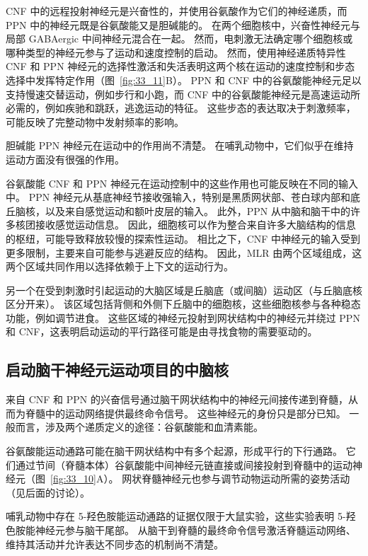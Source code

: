 CNF 中的远程投射神经元是兴奋性的，并使用谷氨酸作为它们的神经递质，而 PPN 中的神经元既是谷氨酸能又是胆碱能的。
在两个细胞核中，兴奋性神经元与局部 GABAergic 中间神经元混合在一起。
然而，电刺激无法确定哪个细胞核或哪种类型的神经元参与了运动和速度控制的启动。
然而，使用神经递质特异性 CNF 和 PPN 神经元的选择性激活和失活表明这两个核在运动的速度控制和步态选择中发挥特定作用（图~\ref{fig:33_11}B）。
PPN 和 CNF 中的谷氨酸能神经元足以支持慢速交替运动，例如步行和小跑，而 CNF 中的谷氨酸能神经元是高速运动所必需的，例如疾驰和跳跃，逃逸运动的特征。
这些步态的表达取决于刺激频率，可能反映了完整动物中发射频率的影响。


胆碱能 PPN 神经元在运动中的作用尚不清楚。
在哺乳动物中，它们似乎在维持运动方面没有很强的作用。


谷氨酸能 CNF 和 PPN 神经元在运动控制中的这些作用也可能反映在不同的输入中。
PPN 神经元从基底神经节接收强输入，特别是黑质网状部、苍白球内部和底丘脑核，以及来自感觉运动和额叶皮层的输入。
此外，PPN 从中脑和脑干中的许多核团接收感觉运动信息。
因此，细胞核可以作为整合来自许多大脑结构的信息的枢纽，可能导致释放较慢的探索性运动。
相比之下，CNF 中神经元的输入受到更多限制，主要来自可能参与逃避反应的结构。
因此，MLR 由两个区域组成，这两个区域共同作用以选择依赖于上下文的运动行为。


另一个在受到刺激时引起运动的大脑区域是丘脑底（或间脑）运动区（与丘脑底核区分开来）。
该区域包括背侧和外侧下丘脑中的细胞核，这些细胞核参与各种稳态功能，例如调节进食。
这些区域的神经元投射到网状结构中的神经元并绕过 PPN 和 CNF，这表明启动运动的平行路径可能是由寻找食物的需要驱动的。



\subsection{启动脑干神经元运动项目的中脑核}

来自 CNF 和 PPN 的兴奋信号通过脑干网状结构中的神经元间接传递到脊髓，从而为脊髓中的运动网络提供最终命令信号。
这些神经元的身份只是部分已知。
一般而言，涉及两个递质定义的途径：谷氨酸能和血清素能。


谷氨酸能运动通路可能在脑干网状结构中有多个起源，形成平行的下行通路。
它们通过节间（脊髓本体）谷氨酸能中间神经元链直接或间接投射到脊髓中的运动神经元（图~\ref{fig:33_10}A）。
网状脊髓神经元也参与调节动物运动所需的姿势活动（见后面的讨论）。


哺乳动物中存在 5-羟色胺能运动通路的证据仅限于大鼠实验，这些实验表明 5-羟色胺能神经元参与脑干尾部。
从脑干到脊髓的最终命令信号激活脊髓运动网络、维持其活动并允许表达不同步态的机制尚不清楚。


